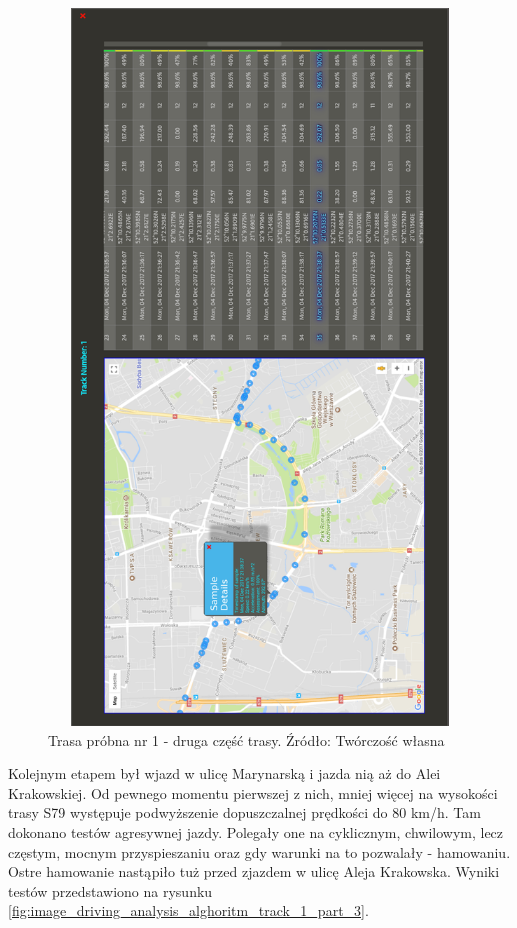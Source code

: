 \begin{figure}[H]
	\centering
	\includegraphics[height=19cm, width=13cm]{img/driving_analysis/test_track_part_2.png}
	\caption{Trasa próbna nr 1 - druga część trasy. Źródło: Twórczość własna}
	\label{fig:image_driving_analysis_alghoritm_track_1_part_2}
\end{figure}

Kolejnym etapem był wjazd w ulicę Marynarską i jazda nią aż do Alei Krakowskiej. Od pewnego momentu pierwszej z nich, mniej więcej na wysokości trasy S79 występuje podwyższenie dopuszczalnej prędkości do 80 km/h. Tam dokonano testów agresywnej jazdy. Polegały one na cyklicznym, chwilowym, lecz częstym, mocnym przyspieszaniu oraz gdy warunki na to pozwalały - hamowaniu. Ostre hamowanie nastąpiło tuż przed zjazdem w ulicę Aleja Krakowska. Wyniki testów przedstawiono na rysunku \ref{fig:image_driving_analysis_alghoritm_track_1_part_3}.

